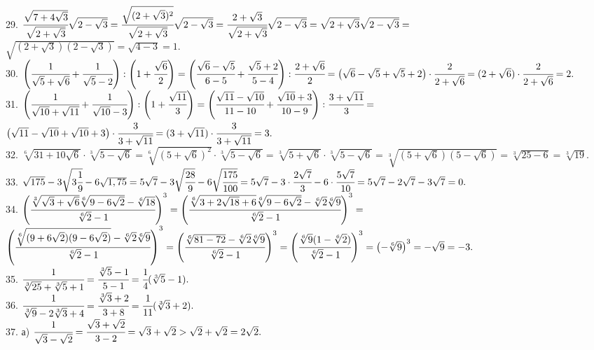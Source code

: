 \documentclass[12pt]{article}
\begin{document}
29. $\cfrac{\sqrt{7+4\sqrt{3}}}{\sqrt{2+\sqrt{3}}}\sqrt{2-\sqrt{3}}=
\cfrac{\sqrt{(2+\sqrt{3})^2}}{\sqrt{2+\sqrt{3}}}\sqrt{2-\sqrt{3}}=
\cfrac{2+\sqrt{3}}{\sqrt{2+\sqrt{3}}}\sqrt{2-\sqrt{3}}=\sqrt{2+\sqrt{3}}\sqrt{2-\sqrt{3}}=$\\$\sqrt{(2+\sqrt{3})(2-\sqrt{3})}=\sqrt{4-3}=1.$\\
30. $\left(\cfrac{1}{\sqrt{5}+\sqrt{6}}+\cfrac{1}{\sqrt{5}-2}\right):\left(1+\cfrac{\sqrt{6}}{2}\right)=
\left(\cfrac{\sqrt{6}-\sqrt{5}}{6-5}+\cfrac{\sqrt{5}+2}{5-4}\right):\cfrac{2+\sqrt{6}}{2}=
\left(\sqrt{6}-\sqrt{5}+\sqrt{5}+2\right)\cdot\cfrac{2}{2+\sqrt{6}}=(2+\sqrt{6})\cdot\cfrac{2}{2+\sqrt{6}}=2.$\\
31. $\left(\cfrac{1}{\sqrt{10}+\sqrt{11}}+\cfrac{1}{\sqrt{10}-3}\right):\left(1+\cfrac{\sqrt{11}}{3}\right)=
\left(\cfrac{\sqrt{11}-\sqrt{10}}{11-10}+\cfrac{\sqrt{10}+3}{10-9}\right):\cfrac{3+\sqrt{11}}{3}=$\\$
\left(\sqrt{11}-\sqrt{10}+\sqrt{10}+3\right)\cdot\cfrac{3}{3+\sqrt{11}}=
(3+\sqrt{11})\cdot\cfrac{3}{3+\sqrt{11}}=3.$\\
32. $\sqrt[6]{31+10\sqrt{6}}\cdot\sqrt[3]{5-\sqrt{6}}=\sqrt[6]{(5+\sqrt{6})^2}\cdot\sqrt[3]{5-\sqrt{6}}=\sqrt[3]{5+\sqrt{6}}\cdot\sqrt[3]{5-\sqrt{6}}=
\sqrt[3]{(5+\sqrt{6})(5-\sqrt{6})}=\sqrt[3]{25-6}=\sqrt[3]{19}.$\\
33. $\sqrt{175}-3\sqrt{3\cfrac{1}{9}}-6\sqrt{1,75}=5\sqrt{7}-3\sqrt{\cfrac{28}{9}}-6\sqrt{\cfrac{175}{100}}=
5\sqrt{7}-3\cdot\cfrac{2\sqrt{7}}{3}-6\cdot\cfrac{5\sqrt{7}}{10}=5\sqrt{7}-2\sqrt{7}-3\sqrt{7}=0.$\\
34. $\left(\cfrac{\sqrt[3]{\sqrt{3}+\sqrt{6}}\sqrt[6]{9-6\sqrt{2}}-\sqrt[6]{18}}{\sqrt[6]{2}-1}\right)^3=
\left(\cfrac{\sqrt[6]{3+2\sqrt{18}+6}\sqrt[6]{9-6\sqrt{2}}-\sqrt[6]{2}\sqrt[6]{9}}{\sqrt[6]{2}-1}\right)^3=$\\$
\left(\cfrac{\sqrt[6]{(9+6\sqrt{2})(9-6\sqrt{2})}-\sqrt[6]{2}\sqrt[6]{9}}{\sqrt[6]{2}-1}\right)^3=
\left(\cfrac{\sqrt[6]{81-72}-\sqrt[6]{2}\sqrt[6]{9}}{\sqrt[6]{2}-1}\right)^3=
\left(\cfrac{\sqrt[6]{9}(1-\sqrt[6]{2})}{\sqrt[6]{2}-1}\right)^3=
\left(-\sqrt[6]{9}\right)^3=-\sqrt{9}=-3.$\\
35. $\cfrac{1}{\sqrt[3]{25}+\sqrt[3]{5}+1}=\cfrac{\sqrt[3]{5}-1}{5-1}=\cfrac{1}{4}(\sqrt[3]{5}-1).$\\
36. $\cfrac{1}{\sqrt[3]{9}-2\sqrt[3]{3}+4}=\cfrac{\sqrt[3]{3}+2}{3+8}=\cfrac{1}{11}(\sqrt[3]{3}+2).$\\
37. а) $\cfrac{1}{\sqrt{3}-\sqrt{2}}=\cfrac{\sqrt{3}+\sqrt{2}}{3-2}=\sqrt{3}+\sqrt{2}>\sqrt{2}+\sqrt{2}=2\sqrt{2}.$\\
\end{document}
